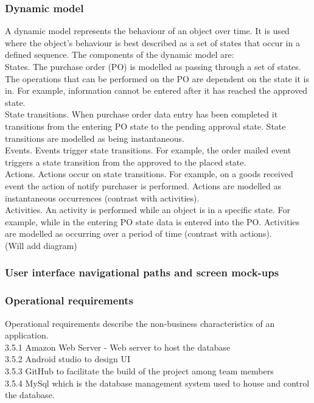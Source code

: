 \documentclass[12pt]{article}
\begin{document}
\subsubsection{Dynamic model}
A dynamic model represents the behaviour of an object over time. It is used where the object's behaviour is best described as a set of states that occur in a defined sequence. The components of the dynamic model are:\\
 	States. The purchase order (PO) is modelled as passing through a set of states. The operations that can be performed on the PO are dependent on the state it is in. For example, information cannot be entered after it has reached the approved state.\\
	State transitions. When purchase order data entry has been completed it transitions from the entering PO state to the pending approval state. State transitions are modelled as being instantaneous.\\
	Events. Events trigger state transitions. For example, the order mailed event triggers a state transition from the approved to the placed state.\\
	Actions. Actions occur on state transitions. For example, on a goods received event the action of notify purchaser is performed. Actions are modelled as instantaneous occurrences (contrast with activities).\\
	Activities. An activity is performed while an object is in a specific state. For example, while in the entering PO state data is entered into the PO. Activities are modelled as occurring over a period of time (contrast with actions).\\
	(Will add diagram)\\
\subsubsection{User interface navigational paths and screen mock-ups} 

\subsubsection{Operational requirements}
Operational requirements describe the non-business characteristics of an application.\\
3.5.1 Amazon Web Server - Web server to host the database\\ 
3.5.2 Android studio to design UI\\
3.5.3 GitHub to facilitate the build of the project among team members\\
3.5.4 MySql which is the database management system used to house and control the database.\\

\end{document}
